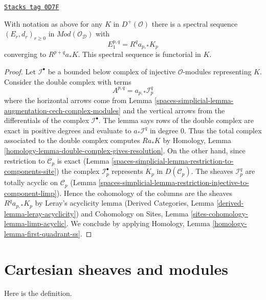 \begin{lemma}
\label{spaces-simplicial-lemma-augmentation-spectral-sequence-modules}
\href{https://stacks.math.columbia.edu/tag/0D7F}{\texttt{Stacks tag 0D7F}}

With notation as above for any $K$ in $D^+(\mathcal{O})$ there is a spectral
sequence $(E_r, d_r)_{r \geq 0}$ in $\textit{Mod}(\mathcal{O}_\mathcal{D})$
with
$$
E_1^{p, q} = R^qa_{p, *} K_p
$$
converging to $R^{p + q}a_*K$. This spectral sequence is functorial in $K$.
\end{lemma}

\begin{proof}
Let $\mathcal{I}^\bullet$ be a bounded below complex of injective
$\mathcal{O}$-modules representing $K$. Consider the double complex with terms
$$
A^{p, q} = a_{p, *}\mathcal{I}^q_p
$$
where the horizontal arrows come from
Lemma \ref{spaces-simplicial-lemma-augmentation-cech-complex-modules}
and the vertical arrows from the differentials of the
complex $\mathcal{I}^\bullet$. The lemma
says rows of the double complex are exact
in positive degrees and evaluate to
$a_*\mathcal{I}^q$ in degree $0$.
Thus the total complex associated to the double complex
computes $Ra_*K$ by
Homology, Lemma \ref{homology-lemma-double-complex-gives-resolution}.
On the other hand, since restriction to $\mathcal{C}_p$ is exact
(Lemma \ref{spaces-simplicial-lemma-restriction-to-components-site})
the complex $\mathcal{I}_p^\bullet$ represents $K_p$ in
$D(\mathcal{C}_p)$. The sheaves $\mathcal{I}_p^q$
are totally acyclic on $\mathcal{C}_p$
(Lemma \ref{spaces-simplicial-lemma-restriction-injective-to-component-limp}).
Hence the cohomology of the columns are the sheaves
$R^qa_{p, *}K_p$ by Leray's acyclicity lemma
(Derived Categories, Lemma \ref{derived-lemma-leray-acyclicity})
and
Cohomology on Sites, Lemma \ref{sites-cohomology-lemma-limp-acyclic}.
We conclude by applying
Homology, Lemma \ref{homology-lemma-first-quadrant-ss}.
\end{proof}

\section{Cartesian sheaves and modules}
\label{spaces-simplicial-section-cartesian}
Here is the definition.

